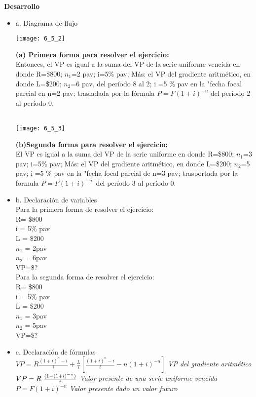 	\textbf{Desarrollo}
	\begin{itemize}
		\item a. Diagrama de flujo
		\begin{center}
			\texttt{[image: 6\_5\_2]}
		\end{center}
		
        \textbf{(a) Primera forma para resolver el ejercicio:}\\
        Entonces, el VP es igual a la suma del VP de la serie uniforme vencida en donde R=\$800; $n_{1}$=2 pav; i=5\% pav; Más: el VP del gradiente aritmético, en donde L=\$200; $n_{2}$=6 pav, del período 8 al 2; i =5 \% pav en la "fecha focal parcial en n=2 pav; trasladada por la fórmula $P=F(1+i)^{-n}$ del período 2 al período 0. \\
        \\
        \begin{center}
			\texttt{[image: 6\_5\_3]}
		\end{center}
		
        \textbf{(b)Segunda forma para resolver el ejercicio:}\\
        El VP es igual a la suma del VP de la serie uniforme en donde R=\$800; $n_{1}$=3 pav; i=5\% pav; Más: el VP del gradiente aritmético, en donde L=\$200; $n_{2}$=5 pav; i =5 \% pav en la "fecha focal parcial de n=3 pav; trasportada por la formula $P=F(1+i)^{-n}$\ del período 3 al período 0.\\
				
		\item b. Declaración de variables \\
		Para la primera forma de resolver el ejercicio: \\
		R= \$800\\
		i = 5\% pav\\
		L = \$200\\
		$n_{1}$ = 2pav\\
		$n_{2}$ = 6pav \\
		VP=\$?\\
		Para la segunda forma de resolver el ejercicio:\\
	    R= \$800\\
		i = 5\% pav\\
		L = \$200\\
		$n_{1}$ = 3pav\\
		$n_{2}$ = 5pav \\
		VP=\$?\\
		\item c. Declaración de fórmulas\\
$VP=R\frac{(1+i)^n-i}{i}+\frac{L}{i}[\frac{(1+i)^n-i}{i}-n(1+i)^{-n}]$\hspace{3 pt} \textit{VP del gradiente aritmético}\\
		$VP=R\hspace{3 pt}\frac{(1-(1+i)^{-n})}{i}$ \hspace{10 pt} \textit{Valor presente de una serie uniforme vencida}\\
        $P=F(1+i)^{-n}$ \hspace {35 pt} \textit{Valor presente dado un valor futuro}\\
        

\end{itemize}
